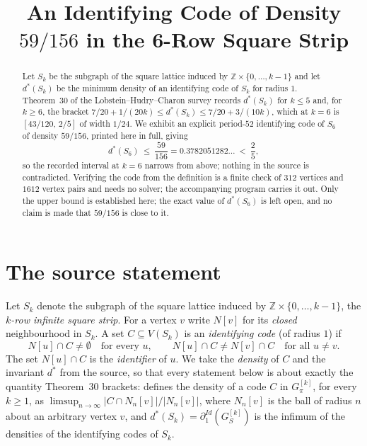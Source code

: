 \documentclass[11pt]{amsart}
\title[An identifying code of density 59/156 in the 6-row square strip]
{An Identifying Code of Density $59/156$ in the 6-Row Square Strip}
\date{}
\theoremstyle{remark}
\newcommand{\Ncl}{N}
\newcommand{\dstar}{d^{*}}
\begin{document}
\begin{abstract}
Let $S_k$ be the subgraph of the square lattice induced by
$\mathbb Z\times\{0,\dots,k-1\}$ and let $\dstar(S_k)$ be the minimum density of an
identifying code of $S_k$ for radius $1$. Theorem~30 of the Lobstein--Hudry--Charon
survey records $\dstar(S_k)$ for $k\le5$ and, for $k\ge6$, the bracket
$7/20+1/(20k)\le \dstar(S_k)\le 7/20+3/(10k)$, which at $k=6$ is
$[43/120,\,2/5]$ of width $1/24$. We exhibit an explicit period-$52$ identifying code
of $S_6$ of density $59/156$, printed here in full, giving
\[
  \dstar(S_6)\ \le\ \frac{59}{156}=0.3782051282\ldots\ <\ \frac25 ,
\]
so the recorded interval at $k=6$ narrows from above; nothing in the source is contradicted.
Verifying the code from the definition is a finite check of $312$ vertices and $1612$ vertex
pairs and needs no solver; the accompanying program carries it out. Only the upper bound is
established here; the exact value of $\dstar(S_6)$ is left open, and no claim is made that
$59/156$ is close to it.
\end{abstract}

\maketitle

\section{The source statement}

Let $S_k$ denote the subgraph of the square lattice induced by
$\mathbb Z\times\{0,\dots,k-1\}$, the \emph{$k$-row infinite square strip}. For a vertex
$v$ write $\Ncl[v]$ for its \emph{closed} neighbourhood in $S_k$. A set
$C\subseteq V(S_k)$ is an \emph{identifying code} (of radius $1$) if
\begin{equation}\label{eq:idc}
  \Ncl[u]\cap C\neq\emptyset \quad\text{for every }u,
  \qquad
  \Ncl[u]\cap C\neq \Ncl[v]\cap C \quad\text{for all } u\neq v .
\end{equation}
The set $\Ncl[u]\cap C$ is the \emph{identifier} of $u$. We take the \emph{density} of $C$ and
the invariant $\dstar$ from the source, so that every statement below is about exactly the
quantity Theorem~30 brackets: \cite[Section~6.4.1]{LHC} defines the density of a code $C$ in
$G_\pi^{[k]}$, for every $k\ge1$, as
$\limsup_{n\to\infty}|C\cap N_n[v]|/|N_n[v]|$, where $N_n[v]$ is the ball of radius $n$ about an
arbitrary vertex $v$, and $\dstar(S_k)=\partial_1^{Id}(G_S^{[k]})$ is the infimum of the densities
of the identifying codes of $S_k$.
\end{document}
